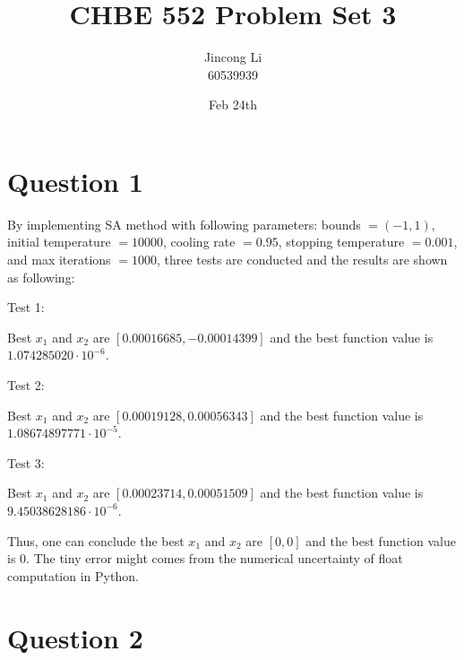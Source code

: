\documentclass[a4paper,12pt]{article} %
\begin{document}
\setlength{\parskip}{1em} 
\setlength{\parindent}{0pt}
\newcommand{\vect}[1]{\mathbf{#1}}

\title{CHBE 552 Problem Set 3}
\author{Jincong Li \\ 60539939}
\date{Feb 24th}
\maketitle

\section*{\textbf{Question 1}}
By implementing SA method with following parameters: bounds $= (-1, 1)$, initial temperature $= 10000$, cooling rate $= 0.95$, stopping temperature $= 0.001$, and max iterations $= 1000$,
three tests are conducted and the results are shown as following:

Test 1:

Best $x_1$ and $x_2$ are $[ 0.00016685, -0.00014399]$ and the
best function value is $1.074285020 \cdot 10^{-6}$.

Test 2:

Best $x_1$ and $x_2$ are $[0.00019128, 0.00056343]$ and the
best function value is $1.08674897771 \cdot 10^{-5}$.

Test 3:

Best $x_1$ and $x_2$ are $[0.00023714, 0.00051509]$ and the
best function value is $9.45038628186 \cdot 10^{-6}$.

Thus, one can conclude the best $x_1$ and $x_2$ are $[0, 0]$ and the
best function value is $0$. The tiny error might comes from the numerical uncertainty of float computation in Python.

\section*{\textbf{Question 2}}
\end{document}
